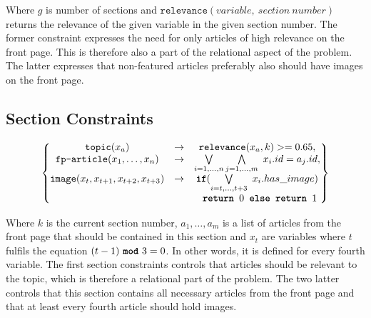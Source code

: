 Where $g$ is number of sections and $\texttt{relevance}(variable,\ section\ number)$ returns the relevance of the given variable in the given section number. The former constraint expresses the need for only articles of high relevance on the front page. This is therefore also a part of the relational aspect of the problem. The latter expresses that non-featured articles preferably also should have images on the front page.

\subsection*{Section Constraints}
\hspace{-40pt}
\begin{minipage}{.9\largefigure}
\vspace{-30pt}
\begin{align}
	\begin{Bmatrix}
		\texttt{topic}(x_a) &\rightarrow& \texttt{relevance}(x_a,k) >= 0.65,\\
		\texttt{fp-article}(x_1,\dots,x_n) &\rightarrow& \bigvee\limits_{i=1,\dots,n}\bigwedge\limits_{j=1,\dots,m}\ x_i.id = a_j.id,\\
		\texttt{image}(x_t, x_{t+1}, x_{t+2}, x_{t+3}) &\rightarrow& \texttt{\textbf{if}}(\bigvee\limits_{i=t,\dots,t+3}\ x_i.has\_image)\\
		&& \texttt{\textbf{ return }}0\texttt{\textbf{ else return }}1
	\end{Bmatrix}
	\label{eq:section_constraints}
\end{align}
\end{minipage}

Where $k$ is the current section number, $a_1,\dots,a_m$ is a list of articles from the front page that should be contained in this section and $x_t$ are variables where $t$ fulfils the equation $(t-1)\ \texttt{\textbf{mod}}\ 3 = 0$. In other words, it is defined for every fourth variable. The first section constraints controls that articles should be relevant to the topic, which is therefore a relational part of the problem. The two latter controls that this section contains all necessary articles from the front page and that at least every fourth article should hold images.

